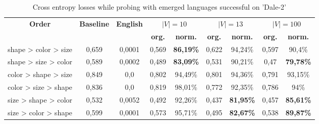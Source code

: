 \begin{table}[h]
    \centering
    \begin{tabular}{c|cc|cc|cc|cc}
        \toprule
        \textbf{Order}          & \textbf{Baseline} & \textbf{English} & \multicolumn{2}{c}{$|V| = 10$} & \multicolumn{2}{c}{$|V| = 13$} & \multicolumn{2}{c}{$|V| = 100$}                                                           \\\cmidrule(lr){4-5}\cmidrule(lr){6-7}\cmidrule(lr){8-9}
                                &                   &                  & \textbf{org.}                  & \textbf{norm.}                 & \textbf{org.}                   & \textbf{norm.}     & \textbf{org.} & \textbf{norm.}     \\\midrule
        {shape > color > size}  & {0,659}           & {0,0001}         & {0,569}                        & \textbf{86,19\%}               & {0,622}                         & {94,24\%}          & {0,597}       & {90,4\%}           \\
        {shape > size > color}  & {0,589}           & {0,0002}         & {0,489}                        & \textbf{83,09\%}               & {0,531}                         & {90,21\%}          & {0,47}        & {\textbf{79,78\%}} \\
        {color > shape > size}  & {0,849}           & {0,0}            & {0,802}                        & 94,49\%                        & {0,801}                         & {94,36\%}          & {0,791}       & {93,15\%}          \\
        {color  > size > shape} & {0,836}           & {0,0}            & {0,819}                        & 98,01\%                        & {0,772}                         & {92,35\%}          & {0,786}       & {94\%}             \\
        {size > shape > color}  & {0,532}           & {0,0052}         & {0,492}                        & 92,26\%                        & {0,437}                         & {\textbf{81,95\%}} & {0,457}       & {\textbf{85,61\%}} \\
        {size > color > shape}  & {0,599}           & {0,0001}         & {0,573}                        & 95,71\%                        & {0,495}                         & {\textbf{82,67\%}} & {0,538}       & {\textbf{89,87\%}} \\
        \bottomrule
    \end{tabular}
    \caption{Cross entropy losses while probing with emerged languages successful on 'Dale-2'}
    \label{tab:probing_discrimnator_language}
\end{table}


